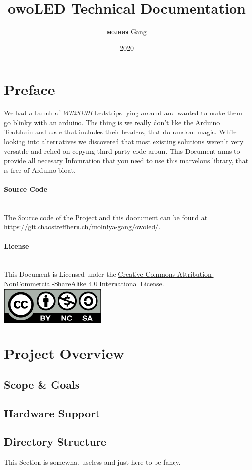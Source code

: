 \documentclass[12pt]{article}
\title{owoLED Technical Documentation}
\date{2020}
\author{молния Gang}
\newcommand{\betterParagraph}[1]{\paragraph{#1}\mbox{}\\}
\begin{document}


\tableofcontents

\newpage

\section*{Preface}
We had a bunch of \textit{WS2813B} Led\-strips lying around and wanted to make them go blinky with an arduino.
The thing is we really don't like the Arduino Toolchain and code that includes their headers, that do random magic.
While looking into alternatives we discovered that most existing solutions weren't very versatile and relied on  copying third party code aroun.
\bigbreak
This Document aims to provide all necesary Infomration that you need to use this marvelous library, that is free of Arduino bloat. 

\betterParagraph{Source Code}
The Source code of the Project and this doccument can be found at \url{https://git.chaostreffbern.ch/molniya-gang/owoled/}.

\betterParagraph{License}
This Document is Licensed under the \href{https://creativecommons.org/licenses/by-nc-sa/4.0/}{Creative Commons Attribution-NonCommercial-ShareAlike 4.0 International} License.
\bigbreak
\includegraphics{cc-by-nc-sa_icon.png}
\bigbreak

\newpage
\section{Project Overview}

\subsection{Scope \& Goals}

\subsection{Hardware Support}

\subsection{Directory Structure}
This Section is somewhat useless and just here to be fancy.
\bigskip
\end{document}
